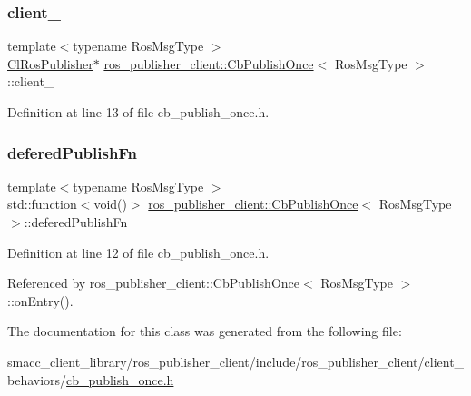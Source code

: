 \subsubsection{\texorpdfstring{client\+\_\+}{client\_}}
{\footnotesize\ttfamily template$<$typename Ros\+Msg\+Type $>$ \\
\hyperlink{classros__publisher__client_1_1ClRosPublisher}{Cl\+Ros\+Publisher}$\ast$ \hyperlink{classros__publisher__client_1_1CbPublishOnce}{ros\+\_\+publisher\+\_\+client\+::\+Cb\+Publish\+Once}$<$ Ros\+Msg\+Type $>$\+::client\+\_\+\hspace{0.3cm}{\ttfamily [private]}}



Definition at line 13 of file cb\+\_\+publish\+\_\+once.\+h.

\mbox{\label{classros__publisher__client_1_1CbPublishOnce_a91e0e3d574d25e160bcb3a4ca81bb0b2}} 
\subsubsection{\texorpdfstring{defered\+Publish\+Fn}{deferedPublishFn}}
{\footnotesize\ttfamily template$<$typename Ros\+Msg\+Type $>$ \\
std\+::function$<$void()$>$ \hyperlink{classros__publisher__client_1_1CbPublishOnce}{ros\+\_\+publisher\+\_\+client\+::\+Cb\+Publish\+Once}$<$ Ros\+Msg\+Type $>$\+::defered\+Publish\+Fn\hspace{0.3cm}{\ttfamily [private]}}



Definition at line 12 of file cb\+\_\+publish\+\_\+once.\+h.



Referenced by ros\+\_\+publisher\+\_\+client\+::\+Cb\+Publish\+Once$<$ Ros\+Msg\+Type $>$\+::on\+Entry().



The documentation for this class was generated from the following file\+:\begin{DoxyCompactItemize}
\item 
smacc\+\_\+client\+\_\+library/ros\+\_\+publisher\+\_\+client/include/ros\+\_\+publisher\+\_\+client/client\+\_\+behaviors/\hyperlink{cb__publish__once_8h}{cb\+\_\+publish\+\_\+once.\+h}\end{DoxyCompactItemize}
